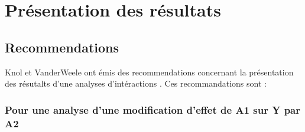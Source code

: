 \documentclass[
]{book}
\begin{document}
\hypertarget{pruxe9sentation-des-ruxe9sultats}{%
\chapter{Présentation des résultats}\label{pruxe9sentation-des-ruxe9sultats}}

\hypertarget{recommendations}{%
\section{Recommendations}\label{recommendations}}

Knol et VanderWeele ont émis des recommendations concernant la présentation des résutalts d'une analyses d'intéractions \citet{knol_recommendations_2012}. Ces recommandations sont :

\hypertarget{pour-une-analyse-dune-modification-deffet-de-a1-sur-y-par-a2}{%
\subsection*{Pour une analyse d'une modification d'effet de A1 sur Y par A2}\label{pour-une-analyse-dune-modification-deffet-de-a1-sur-y-par-a2}}
\end{document}

